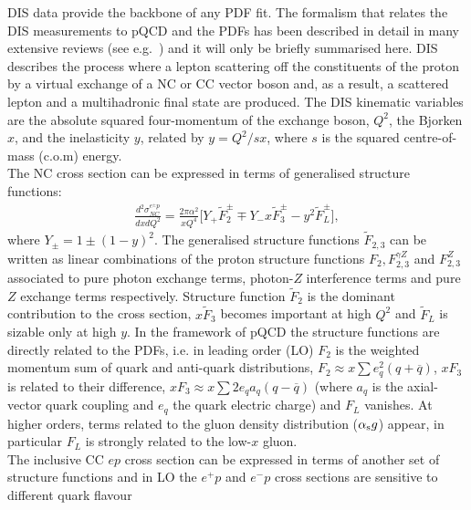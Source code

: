 DIS data provide the backbone of any PDF fit.
The formalism that relates the DIS measurements to pQCD and the PDFs has been described
in detail in many extensive reviews (see e.g.~\cite{disbook}) and it will only be briefly summarised here.
DIS describes the process where a lepton scattering off the constituents of the proton
by a virtual exchange of a NC 
or CC vector boson and, as a result, a scattered lepton and a 
multihadronic final state are produced.
The DIS kinematic variables are the absolute squared four-momentum of 
the exchange boson, $Q^2$, the Bjorken $x$, 
and the inelasticity $y$, related by $y=Q^2/sx$, where $s$ is the squared centre-of-mass (c.o.m) energy.
\\
%
The NC cross section can be expressed in terms of generalised structure functions:
\begin{eqnarray}
   \frac{d^2\sigma_{NC}^{e^{\pm} p}}{dxdQ^2}=\frac{2\pi\alpha^2}{xQ^4} 
     \big [ Y_{+} \tilde F_2^{\pm} \mp Y_{-}x \tilde F_3^{\pm} - y^2 \tilde F_L^{\pm} \big ],
\end{eqnarray}
where $Y_{\pm} = 1 \pm (1-y)^2$. The generalised structure functions $\tilde F_{2,3}$ 
can be written as linear combinations of the proton structure functions $F_2, F_{2,3}^{\gamma Z}$ 
and $F_{2,3}^Z$ associated to pure photon exchange terms, photon-$Z$ interference
terms and pure $Z$ exchange terms respectively. 
Structure function $\tilde F_2$ is the dominant contribution to the cross section, 
$x \tilde F_3$ becomes important at high $Q^2$ and $\tilde F_L$ is sizable 
only at high $y$. 
In the framework of pQCD the structure functions are directly related to the 
PDFs, i.e. in leading order (LO)  $F_2$ is the weighted momentum sum of quark and anti-quark distributions, 
$F_2 \approx x \sum e^2_q (q+ \overline q)$, $xF_3$ is related to their difference, 
$xF_3 \approx x \sum 2e_q a_q (q- \overline q)$ (where $a_q$ is the axial-vector 
quark coupling and $e_q$ the quark electric charge) and $F_L$ vanishes. 
At higher orders, terms related to the gluon density distribution
($\alpha_\mathrm{s} g$) appear, in particular $F_L$ is strongly related to the low-$x$ 
gluon.
\\
The inclusive CC $ep$ cross section can be expressed 
in terms of another set of structure functions and in LO the $e^+p$ and $e^-p$ cross sections are sensitive to different quark flavour 

